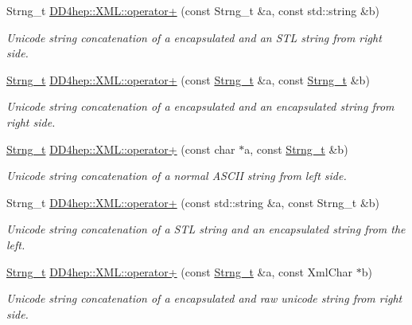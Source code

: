 \begin{DoxyCompactItemize}
Strng\_\-t \hyperlink{group___d_d4_h_e_p___x_m_l_gaf514b02eb314678df1b7149c4f0025b2}{DD4hep::XML::operator+} (const Strng\_\-t \&a, const std::string \&b)
\begin{DoxyCompactList}\small\item\em Unicode string concatenation of a encapsulated and an STL string from right side. \item\end{DoxyCompactList}\item 
\hyperlink{class_d_d4hep_1_1_x_m_l_1_1_strng__t}{Strng\_\-t} \hyperlink{group___d_d4_h_e_p___x_m_l_ga16907b7f06827dc354d29834328834f8}{DD4hep::XML::operator+} (const \hyperlink{class_d_d4hep_1_1_x_m_l_1_1_strng__t}{Strng\_\-t} \&a, const \hyperlink{class_d_d4hep_1_1_x_m_l_1_1_strng__t}{Strng\_\-t} \&b)
\begin{DoxyCompactList}\small\item\em Unicode string concatenation of a encapsulated and an encapsulated string from right side. \item\end{DoxyCompactList}\item 
\hyperlink{class_d_d4hep_1_1_x_m_l_1_1_strng__t}{Strng\_\-t} \hyperlink{group___d_d4_h_e_p___x_m_l_gad9d4f784bd934ca00c54efe28b42c7d2}{DD4hep::XML::operator+} (const char $\ast$a, const \hyperlink{class_d_d4hep_1_1_x_m_l_1_1_strng__t}{Strng\_\-t} \&b)
\begin{DoxyCompactList}\small\item\em Unicode string concatenation of a normal ASCII string from left side. \item\end{DoxyCompactList}\item 
Strng\_\-t \hyperlink{group___d_d4_h_e_p___x_m_l_gab7183a795b02243de6de9f3cd3665cb0}{DD4hep::XML::operator+} (const std::string \&a, const Strng\_\-t \&b)
\begin{DoxyCompactList}\small\item\em Unicode string concatenation of a STL string and an encapsulated string from the left. \item\end{DoxyCompactList}\item 
\hyperlink{class_d_d4hep_1_1_x_m_l_1_1_strng__t}{Strng\_\-t} \hyperlink{group___d_d4_h_e_p___x_m_l_ga80dcfab5263e77bc2580f30c7d0e4f2e}{DD4hep::XML::operator+} (const \hyperlink{class_d_d4hep_1_1_x_m_l_1_1_strng__t}{Strng\_\-t} \&a, const XmlChar $\ast$b)
\begin{DoxyCompactList}\small\item\em Unicode string concatenation of a encapsulated and raw unicode string from right side. \item\end{DoxyCompactList}\item 

\end{DoxyCompactItemize}

